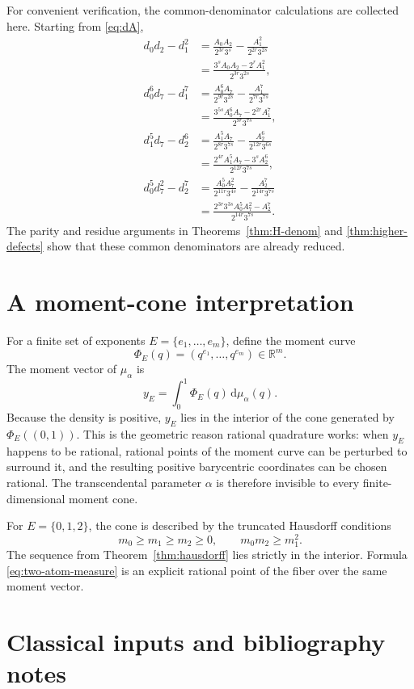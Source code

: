 \documentclass[11pt,oneside]{article}
\theoremstyle{definition}
\theoremstyle{remark}
\newcommand{\R}{\mathbb R}
\newcommand{\dd}{\,\mathrm d}
\begin{document}
For convenient verification, the common-denominator calculations are collected here.
Starting from \eqref{eq:dA},
\begin{align*}
 d_0d_2-d_1^2
 &=\frac{A_0A_2}{2^{3r}3^s}
   -\frac{A_1^2}{2^{2r}3^{2s}}\\
 &=\frac{3^sA_0A_2-2^rA_1^2}{2^{3r}3^{2s}},\\[0.4em]
 d_0^6d_7-d_1^7
 &=\frac{A_0^6A_7}{2^{9r}3^{2s}}
   -\frac{A_1^7}{2^{7r}3^{7s}}\\
 &=\frac{3^{5s}A_0^6A_7-2^{2r}A_1^7}{2^{9r}3^{7s}},\\[0.4em]
 d_1^5d_7-d_2^6
 &=\frac{A_1^5A_7}{2^{8r}3^{7s}}
   -\frac{A_2^6}{2^{12r}3^{6s}}\\
 &=\frac{2^{4r}A_1^5A_7-3^sA_2^6}{2^{12r}3^{7s}},\\[0.4em]
 d_0^5d_7^2-d_2^7
 &=\frac{A_0^5A_7^2}{2^{11r}3^{4s}}
   -\frac{A_2^7}{2^{14r}3^{7s}}\\
 &=\frac{2^{3r}3^{3s}A_0^5A_7^2-A_2^7}{2^{14r}3^{7s}}.
\end{align*}
The parity and residue arguments in Theorems~\ref{thm:H-denom} and
\ref{thm:higher-defects} show that these common denominators are already reduced.

\section{A moment-cone interpretation}

For a finite set of exponents $E=\{e_1,\ldots,e_m\}$, define the moment curve
\[
 \Phi_E(q)=(q^{e_1},\ldots,q^{e_m})\in\R^m.
\]
The moment vector of $\mu_\alpha$ is
\[
 y_E=\int_0^1\Phi_E(q)\dd\mu_\alpha(q).
\]
Because the density is positive, $y_E$ lies in the interior of the cone generated by
$\Phi_E((0,1))$.  This is the geometric reason rational quadrature works: when $y_E$ happens
to be rational, rational points of the moment curve can be perturbed to surround it, and the
resulting positive barycentric coordinates can be chosen rational.  The transcendental
parameter $\alpha$ is therefore invisible to every finite-dimensional moment cone.

For $E=\{0,1,2\}$, the cone is described by the truncated Hausdorff conditions
\[
 m_0\ge m_1\ge m_2\ge0,
 \qquad m_0m_2\ge m_1^2.
\]
The sequence from Theorem~\ref{thm:hausdorff} lies strictly in the interior.  Formula
\eqref{eq:two-atom-measure} is an explicit rational point of the fiber over the same moment
vector.

\section{Classical inputs and bibliography notes}
\end{document}
